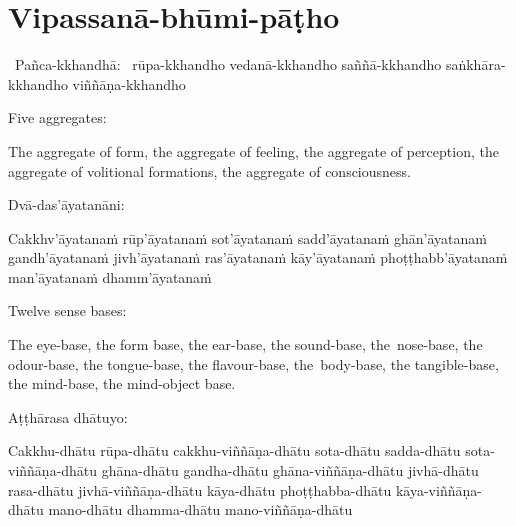 \suttaRef{[Dhs 1]}



\section{Vipassanā-bhūmi-pāṭho}
\label{vipassana-bhumi-patho}

\begin{pali-hang}
  \anglebracketleft\ \hspace{-0.5mm}Pañca-kkhandhā: \hspace{-1.00mm}\anglebracketright\ rūpa-kkhandho vedanā-kkhandho saññā-kkhandho saṅkhāra-kkhandho viññāṇa-kkhandho
\end{pali-hang}

\begin{english-verses}
  Five aggregates:
  \begin{english-hangtogether-verses}
    The aggregate of form, the aggregate of feeling, the aggregate of perception, the aggregate of volitional formations, the aggregate of consciousness.
  \end{english-hangtogether-verses}
\end{english-verses}

\suttaRef{[DN 33]}

\begin{pali-hang-continued}
  Dvā-das'āyatanāni:
  \begin{pali-hang}
    Cakkhv'āyatanaṁ rūp'āyatanaṁ sot'āyatanaṁ sadd'āyatanaṁ ghān'āyatanaṁ gandh'āyatanaṁ jivh'āyatanaṁ ras'āyatanaṁ kāy'āyatanaṁ phoṭṭhabb'āyatanaṁ man'āyatanaṁ dhamm'āyatanaṁ
  \end{pali-hang}
\end{pali-hang-continued}

\begin{english-verses}
  Twelve sense bases:
  \begin{english-hangtogether-verses}
    The eye-base, the form base, the ear-base, the sound-base, the~nose-base, the odour-base, the tongue-base, the flavour-base, the~body-base, the tangible-base, the mind-base, the mind-object base.
  \end{english-hangtogether-verses}
\end{english-verses}

\suttaRef{[MN 148]}

\begin{pali-hang-continued}
  Aṭṭhārasa dhātuyo:
  \begin{pali-hang}
    Cakkhu-dhātu rūpa-dhātu cakkhu-viññāṇa-dhātu sota-dhātu sadda-dhātu sota-viññāṇa-dhātu ghāna-dhātu gandha-dhātu ghāna-viññāṇa-dhātu jivhā-dhātu rasa-dhātu jivhā-viññāṇa-dhātu kāya-dhātu phoṭṭhabba-dhātu kāya-viññāṇa-dhātu mano-dhātu dhamma-dhātu mano-viññāṇa-dhātu
  \end{pali-hang}
\end{pali-hang-continued}

